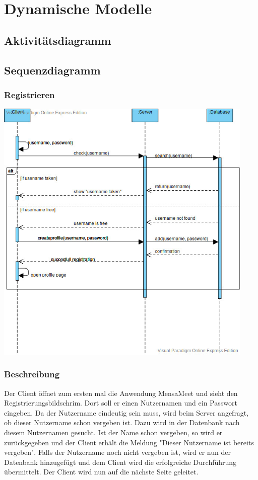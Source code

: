 \documentclass[a4paper]{scrreprt}
\begin{document}
\chapter{Dynamische Modelle}
\section{Aktivitätsdiagramm}

\section{Sequenzdiagramm}
\subsection{Registrieren}
\begin{center}
	\includegraphics[width=0.93\textwidth]{Sequenzdiagramme/SequenzdiagramRegistration.jpg}
\end{center}
\subsection*{Beschreibung}
Der Client öffnet zum ersten mal die Anwendung MensaMeet und sieht den Registrierungsbildschrim. Dort soll er einen Nutzernamen und ein Passwort eingeben. Da der Nutzername eindeutig sein muss, wird beim Server angefragt, ob dieser Nutzername schon vergeben ist. Dazu wird in der Datenbank nach diesem Nutzernamen gesucht. Ist der Name schon vergeben, so wird er zurückgegeben und der Client erhält die Meldung "Dieser Nutzername ist bereits vergeben".
Falls der Nutzername noch nicht vergeben ist, wird er nun der Datenbank hinzugefügt und dem Client wird die erfolgreiche Durchführung übermittelt. Der Client wird nun auf die nächste Seite geleitet.
\newpage
\end{document}

